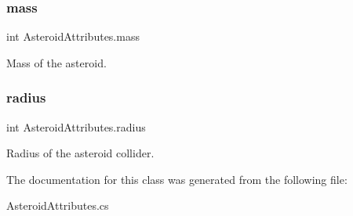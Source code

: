 \subsubsection{\texorpdfstring{mass}{mass}}
{\footnotesize\ttfamily int Asteroid\+Attributes.\+mass}



Mass of the asteroid. 

\mbox{\label{class_asteroid_attributes_a8cc9267ef0f5534260f7ccb7c16c04ca}} 
\subsubsection{\texorpdfstring{radius}{radius}}
{\footnotesize\ttfamily int Asteroid\+Attributes.\+radius}



Radius of the asteroid collider. 



The documentation for this class was generated from the following file\+:\begin{DoxyCompactItemize}
\item 
Asteroid\+Attributes.\+cs\end{DoxyCompactItemize}
